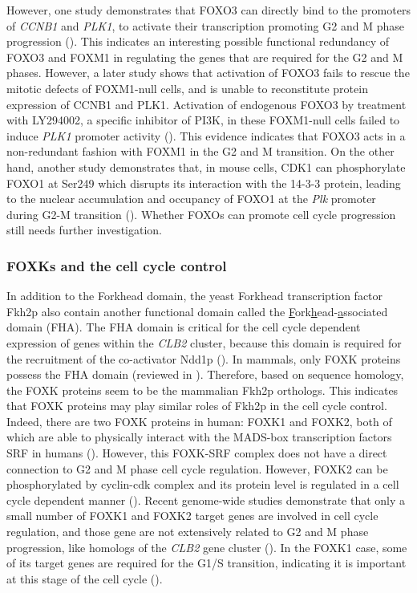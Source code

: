 However, one study demonstrates that FOXO3 can directly bind to the promoters of \textit{CCNB1} and \textit{PLK1}, to activate their transcription promoting G2 and M phase progression (\cite{alvarez2001forkhead}). This indicates an interesting possible functional redundancy of FOXO3 and FOXM1 in regulating the genes that are required for the G2 and M phases. However, a later study shows that activation of FOXO3 fails to rescue the mitotic defects of FOXM1-null cells, and is unable to reconstitute protein expression of CCNB1 and PLK1. Activation of endogenous FOXO3 by treatment with LY294002, a specific inhibitor of PI3K, in these FOXM1-null cells failed to induce \textit{PLK1} promoter activity (\cite{laoukili2005foxm1}). This evidence indicates that FOXO3 acts in a non-redundant fashion with FOXM1 in the G2 and M transition. On the other hand, another study demonstrates that, in mouse cells, CDK1 can phosphorylate FOXO1 at Ser249 which disrupts its interaction with the 14-3-3 protein, leading to the nuclear accumulation and occupancy of FOXO1 at the \textit{Plk} promoter during G2-M transition (\cite{yuan2008activation}). Whether FOXOs can promote cell cycle progression still needs further investigation.

\subsubsection{FOXKs and the cell cycle control}

In addition to the Forkhead domain, the yeast Forkhead transcription factor Fkh2p also contain another functional domain called the \underline{F}ork\underline{h}ead-\underline{a}ssociated domain (FHA). The FHA domain is critical for the cell cycle dependent expression of genes within the \textit{CLB2} cluster, because this domain is required for the recruitment of the co-activator Ndd1p (\cite{darieva2003cell}). In mammals, only FOXK proteins possess the FHA domain (reviewed in \cite{murakami2010regulation}). Therefore, based on sequence homology, the FOXK proteins seem to be the mammalian Fkh2p orthologs. This indicates that FOXK proteins may play similar roles of Fkh2p in the cell cycle control. Indeed, there are two FOXK proteins in human: FOXK1 and FOXK2, both of which are able to physically interact with the MADS-box transcription factors SRF in humans (\cite{freddie2007functional}). However, this FOXK-SRF complex does not have a direct connection to G2 and M phase cell cycle regulation. However, FOXK2 can be phosphorylated by cyclin-cdk complex and its protein level is regulated in a cell cycle dependent manner (\cite{freddie2007functional,marais2010cell}). Recent genome-wide studies demonstrate that only a small number of FOXK1 and FOXK2 target genes are involved in cell cycle regulation, and those gene are not extensively related to G2 and M phase progression, like homologs of the \textit{CLB2} gene cluster (\cite{grant2012live-cell,ji2012the}). In the FOXK1 case, some of its target genes are required for the G1/S transition, indicating it is important at this stage of the cell cycle (\cite{grant2012live-cell}).

